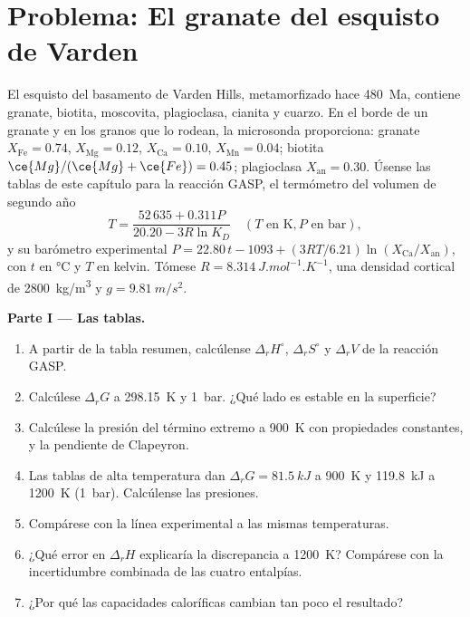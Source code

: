 \section{Problema: El granate del esquisto de Varden}

\begin{problem}
\label{pb:b3:petrological-thermodynamics:1}
El esquisto del basamento de Varden Hills, metamorfizado hace
\qty{480}{Ma}, contiene granate, biotita, moscovita, plagioclasa, cianita y
cuarzo. En el borde de un granate y en los granos que lo rodean, la microsonda
proporciona: granate $X_{\text{Fe}} = 0.74$, $X_{\text{Mg}} = 0.12$, $X_{\text{Ca}} =
0.10$, $X_{\text{Mn}} = 0.04$; biotita $\ce{Mg}/(\ce{Mg} + \ce{Fe}) = 0.45$;
plagioclasa $X_{\text{an}} = 0.30$. Úsense las tablas de este capítulo para la
reacción GASP, el termómetro del volumen de segundo año
\[
T = \frac{52\,635 + 0.311P}{20.20 - 3R\ln K_D}\quad(T \text{ en K}, P
\text{ en bar}),
\]
y su barómetro experimental $P = 22.80\,t - 1093 + (3RT/6.21)\ln
(X_{\text{Ca}}/X_{\text{an}})$, con $t$ en \unit{\celsius} y $T$ en
kelvin. Tómese $R = \qty{8.314}{J.mol^{-1}.K^{-1}}$, una densidad cortical de
\qty{2800}{kg/m^3} y $g = \qty{9.81}{m/s^2}$.

\medskip\noindent\textbf{Parte I --- Las tablas.}
\begin{enumerate}
  \item A partir de la tabla resumen, calcúlense $\Delta_rH^\circ$, $\Delta_rS^\circ$
        y $\Delta_rV$ de la reacción GASP.
  \item Calcúlese $\Delta_rG$ a \qty{298.15}{K} y \qty{1}{bar}. ¿Qué lado
        es estable en la superficie?
  \item Calcúlese la presión del término extremo a \qty{900}{K} con
        propiedades constantes, y la pendiente de Clapeyron.
  \item Las tablas de alta temperatura dan $\Delta_rG = \qty{81.5}{kJ}$ a
        \qty{900}{K} y \qty{119.8}{kJ} a \qty{1200}{K} (\qty{1}{bar}).
        Calcúlense las presiones.
  \item Compárese con la línea experimental a las mismas temperaturas.
  \item ¿Qué error en $\Delta_rH$ explicaría la discrepancia a \qty{1200}{K}?
        Compárese con la incertidumbre combinada de las cuatro entalpías.
  \item ¿Por qué las capacidades caloríficas cambian tan poco el resultado?
\end{enumerate}


\end{problem}
